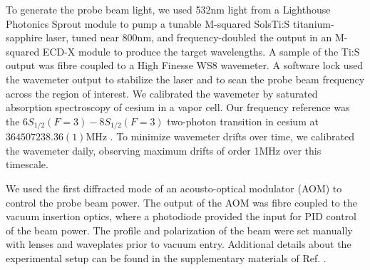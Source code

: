 

To generate the probe beam light, we used 532nm light from a Lighthouse Photonics Sprout module to pump a tunable M-squared SolsTi:S titanium-sapphire laser, tuned near 800nm, and frequency-doubled the output in an M-squared ECD-X module to produce the target wavelengths.
	A sample of the Ti:S output was fibre coupled to a High Finesse WS8 wavemeter.
	A software lock used the wavemeter output to stabilize the laser and to scan the probe beam frequency across the region of interest.
	We calibrated the wavemeter by saturated absorption spectroscopy of cesium in a vapor cell.
	Our frequency reference was the $6S_{1/2}(F=3)-8S_{1/2}(F=3)$ two-photon transition in cesium at $364507238.36(1)$MHz \cite{Wu13}.
	To minimize wavemeter drifts over time, we calibrated the wavemeter daily, observing maximum drifts of order 1MHz over this timescale.
	

We used the first diffracted mode of an acousto-optical modulator (AOM) to control the probe beam power.
	The output of the AOM was fibre coupled to the vacuum insertion optics, where a photodiode provided the input for PID control of the beam power.
	The profile and polarization of the beam were set manually with lenses and waveplates prior to vacuum entry.
	Additional details about the experimental setup can be found in the supplementary materials of Ref.
	\cite{Thomas20}.


